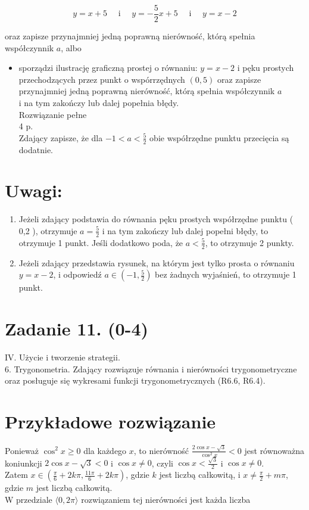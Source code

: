 \documentclass[10pt]{article}
\begin{document}
$$
y=x+5 \quad \text { i } \quad y=-\frac{5}{2} x+5 \quad \text { i } \quad y=x-2
$$

oraz zapisze przynajmniej jedną poprawną nierówność, którą spełnia współczynnik $a$, albo

\begin{itemize}
  \item sporządzi ilustrację graficzną prostej o równaniu: $y=x-2$ i pęku prostych przechodzących przez punkt o wspórrzędnych $(0,5)$ oraz zapisze przynajmniej jedną poprawną nierówność, którą spełnia współczynnik $a$\\
i na tym zakończy lub dalej popełnia błędy.\\
Rozwiązanie pełne\\
4 p.\\
Zdający zapisze, że dla $-1<a<\frac{5}{2}$ obie współrzędne punktu przecięcia są dodatnie.
\end{itemize}

\section*{Uwagi:}
\begin{enumerate}
  \item Jeżeli zdający podstawia do równania pęku prostych współrzędne punktu ( 0,2 ), otrzymuje $a=\frac{5}{2}$ i na tym zakończy lub dalej popełni błędy, to otrzymuje 1 punkt. Jeśli dodatkowo poda, że $a<\frac{5}{2}$, to otrzymuje 2 punkty.
  \item Jeżeli zdający przedstawia rysunek, na którym jest tylko prosta o równaniu $y=x-2$, i odpowiedź $a \in\left(-1, \frac{5}{2}\right)$ bez żadnych wyjaśnień, to otrzymuje 1 punkt.
\end{enumerate}

\section*{Zadanie 11. (0-4)}
IV. Użycie i tworzenie strategii.\\
6. Trygonometria. Zdający rozwiązuje równania i nierówności trygonometryczne oraz posługuje się wykresami funkcji trygonometrycznych (R6.6, R6.4).

\section*{Przykładowe rozwiązanie}
Ponieważ $\cos ^{2} x \geq 0$ dla każdego $x$, to nierówność $\frac{2 \cos x-\sqrt{3}}{\cos ^{2} x}<0$ jest równoważna koniunkcji $2 \cos x-\sqrt{3}<0$ i $\cos x \neq 0$, czyli $\cos x<\frac{\sqrt{3}}{2}$ i $\cos x \neq 0$.\\
Zatem $x \in\left(\frac{\pi}{6}+2 k \pi, \frac{11 \pi}{6}+2 k \pi\right)$, gdzie $k$ jest liczbą całkowitą, i $x \neq \frac{\pi}{2}+m \pi$, gdzie $m$ jest liczbą całkowitą.\\
W przedziale $\langle 0,2 \pi\rangle$ rozwiązaniem tej nierówności jest każda liczba
\end{document}
